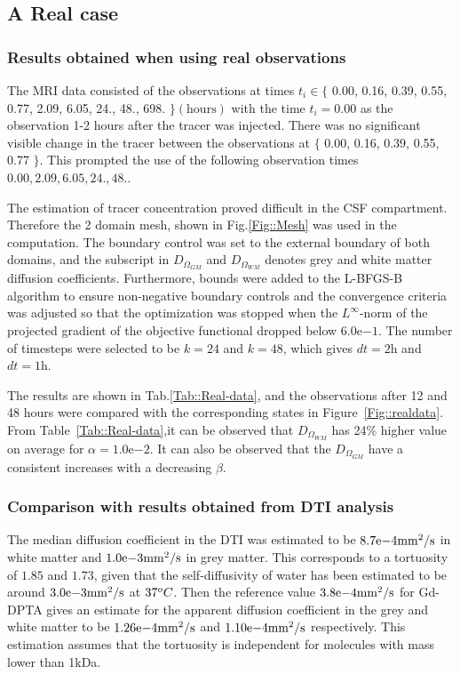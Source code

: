 \documentclass[11pt,a4paper]{article}
\begin{document}
\subsection{A Real case} 

\subsubsection{Results obtained when using real observations}
The MRI data consisted of the observations at times $t_i \in \lbrace$ 0.00, 0.16, 0.39, 0.55, 0.77, 2.09, 6.05, 24., 48., 698. $\rbrace \mathrm{(hours)}$ with the time $t_i=0.00$ as the observation 1-2 hours after the tracer was injected. There was no significant visible change in the tracer between the observations at $\lbrace $ 0.00, 0.16, 0.39, 0.55, 0.77 $ \rbrace$. This prompted the use of the following observation times  $0.00, 2.09, 6.05, 24., 48.$. 

The estimation of tracer concentration proved difficult in the CSF compartment. Therefore the 2 domain mesh, shown in Fig.\ref{Fig::Mesh} was used in the computation. The boundary control was set to the external boundary of both domains, and the subscript in $D_{\Omega_{GM}}$ and $D_{\Omega_{WM}}$ denotes grey and white matter diffusion coefficients. Furthermore, bounds were added to the L-BFGS-B algorithm to ensure non-negative boundary controls and the convergence criteria was adjusted so that the optimization was stopped when the $L^\infty$-norm of the projected gradient of the objective functional dropped below $6.0\mathrm{e}{-1}$. The number of timesteps were selected to be $k=24$ and $k=48$, which gives $dt = 2 \mathrm{h}$ and $dt = 1 \mathrm{h}$.   

The results are shown in Tab.\ref{Tab::Real-data}, and the observations after 12 and 48 hours were compared with the corresponding states in Figure~\ref{Fig::realdata}. From Table~\ref{Tab::Real-data},it can be observed that $D_{\Omega_{WM}}$ has 24\% higher value on average for $\alpha =1.0\mathrm{e}{-2}$. It can also be observed that the $D_{\Omega_{GM}}$ have a consistent increases with a decreasing $\beta$.

\subsubsection{Comparison with results obtained from DTI analysis}
 
The median diffusion coefficient in the DTI was estimated to be $8.7\mathrm{e}{-4} \mathrm{mm\sp{2}/s}$ in white matter and $1.0\mathrm{e}{-3} \mathrm{mm\sp{2}/s}$ in grey matter. This corresponds to a tortuosity of $1.85$ and $1.73$, given that the self-diffusivity of water has been estimated to be around $3.0\mathrm{e}{-3}\mathrm{mm\sp{2}/s}$ at $37\sp{o}C$. Then the reference value $3.8\mathrm{e}{-4} \mathrm{mm\sp{2}/s}$ for Gd-DPTA gives an estimate for the apparent diffusion coefficient in the grey and white matter to  be $ 1.26\mathrm{e}{-4}\mathrm{mm\sp{2}/s}$ and $1.10\mathrm{e}{-4} \mathrm{mm\sp{2}/s}$ respectively. This estimation assumes that the tortuosity is independent for molecules with mass lower than 1kDa. 
\end{document}
